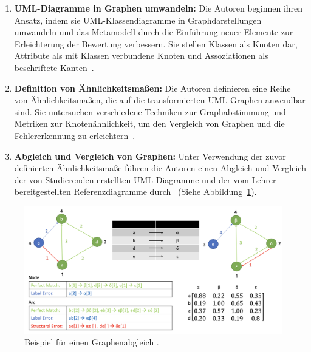 \begin{enumerate}
    \item \textbf{UML-Diagramme in Graphen umwandeln:} Die Autoren beginnen ihren Ansatz, indem sie UML-Klassendiagramme
    in Graphdarstellungen umwandeln und das Metamodell durch die Einführung neuer Elemente zur Erleichterung der
    Bewertung verbessern. Sie stellen Klassen als Knoten dar, Attribute als mit Klassen verbundene Knoten und
    Assoziationen als beschriftete Kanten~\cite{auxepaules2015diagram}.

    \item \textbf{Definition von Ähnlichkeitsmaßen:} Die Autoren definieren eine Reihe von Ähnlichkeitsmaßen, die auf
    die transformierten UML-Graphen anwendbar sind. Sie untersuchen verschiedene Techniken zur Graphabstimmung und
    Metriken zur Knotenähnlichkeit, um den Vergleich von Graphen und die Fehlererkennung zu erleichtern~\cite{fauzan2018class}.

    \item \textbf{Abgleich und Vergleich von Graphen:} Unter Verwendung der zuvor definierten Ähnlichkeitsmaße führen
    die Autoren einen Abgleich und Vergleich der von Studierenden erstellten UML-Diagramme und der vom Lehrer
    bereitgestellten Referenzdiagramme durch~\cite{outair2017towards} (Siehe Abbildung~\ref{fig:graph-matching}).
\end{enumerate}


\begin{figure}
	\centering
	\includegraphics[width=15cm]{images/graph-matching}
	\caption{Beispiel für einen Graphenabgleich \cite{anas2021new}.}
	\label{fig:graph-matching}
\end{figure}

